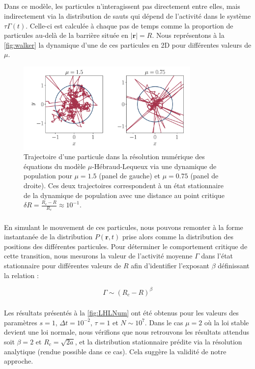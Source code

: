 \subparagraph{}Dans ce modèle, les particules n'interagissent pas directement entre elles, mais indirectement via la distribution de sauts qui dépend de l'activité dans le système $\tau\Gamma (t)$. Celle-ci est calculée à chaque pas de temps comme la proportion de particules au-delà de la barrière située en $|\mathbf{r}|=R$. Nous représentons à la \autoref{fig:walker} la dynamique d'une de ces particules en 2D pour différentes valeurs de $\mu$.

\begin{figure}[h]
	\centering
	\includegraphics[width= 0.8\textwidth]{walker.pdf}
	\caption{Trajectoire d'une particule dans la résolution numérique des équations du modèle $\mu$-Hébraud-Lequeux via une dynamique de population pour $\mu = 1.5$ (panel de gauche) et $\mu = 0.75$ (panel de droite). Ces deux trajectoires correspondent à un état stationnaire de la dynamique de population avec une distance au point critique $\delta R = \frac{R_c-R}{R_c}\approx 10^{-1}$.}
	 \label{fig:walker}
\end{figure}

\subparagraph{}En simulant le mouvement de ces particules, nous pouvons remonter à la forme instantanée de la distribution $P(\mathbf{r},t)$ prise alors comme la distribution des positions des différentes particules. Pour déterminer le comportement critique de cette transition, nous mesurons la valeur de l'activité moyenne $\Gamma$ dans l'état stationnaire pour différentes valeurs de $R$ afin d'identifier l'exposant $\beta$ définissant la relation :

\begin{equation}
	\Gamma \sim (R_c-R)^\beta
\end{equation}

\subparagraph{} Les résultats présentés à la \autoref{fig:LHLNum} ont été obtenus pour les valeurs des paramètres $s=1$, $\Delta t  = 10^{-2}$, $\tau = 1$ et $N \sim 10^7$. Dans le cas $\mu = 2$ où la loi stable devient une loi normale, nous vérifions que nous retrouvons les résultats attendus soit $\beta = 2$ et $R_c = \sqrt{2a}$, et la distribution stationnaire  prédite via la résolution analytique (rendue possible dans ce cas). Cela suggère la validité de notre approche.


